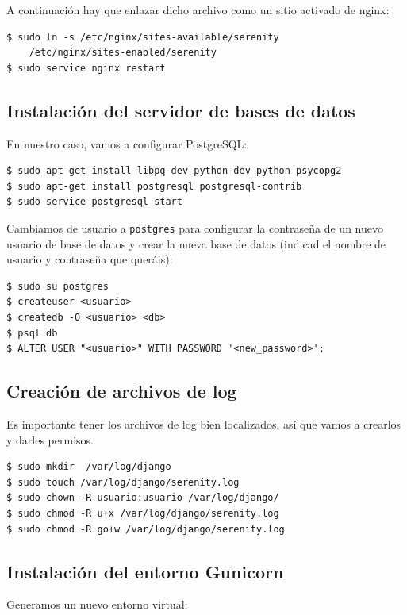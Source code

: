 A continuación hay que enlazar dicho archivo como un sitio activado de nginx:

\begin{verbatim}
$ sudo ln -s /etc/nginx/sites-available/serenity
    /etc/nginx/sites-enabled/serenity
$ sudo service nginx restart
\end{verbatim}


\subsection{Instalación del servidor de bases de datos}

En nuestro caso, vamos a configurar PostgreSQL:

\begin{verbatim}
$ sudo apt-get install libpq-dev python-dev python-psycopg2
$ sudo apt-get install postgresql postgresql-contrib
$ sudo service postgresql start
\end{verbatim}

Cambiamos de usuario a \texttt{postgres} para configurar la contraseña de un
nuevo usuario de base de datos y crear la nueva base de datos (indicad el nombre
de usuario y contraseña que queráis):

\begin{verbatim}
$ sudo su postgres 
$ createuser <usuario>
$ createdb -O <usuario> <db>
$ psql db
$ ALTER USER "<usuario>" WITH PASSWORD '<new_password>';
\end{verbatim}


\subsection{Creación de archivos de log}

Es importante tener los archivos de log bien localizados, así que vamos a
crearlos y darles permisos.

\begin{verbatim}
$ sudo mkdir  /var/log/django
$ sudo touch /var/log/django/serenity.log
$ sudo chown -R usuario:usuario /var/log/django/
$ sudo chmod -R u+x /var/log/django/serenity.log
$ sudo chmod -R go+w /var/log/django/serenity.log
\end{verbatim}


\subsection{Instalación del entorno Gunicorn}

Generamos un nuevo entorno virtual:

